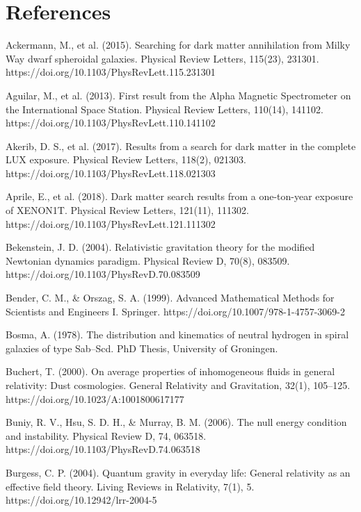 \documentclass[11pt]{article}
\begin{document}
\section{References}\label{}

\nocite{*}



\iffalse %

Ackermann, M., et al. (2015). Searching for dark matter annihilation from Milky Way dwarf spheroidal galaxies. Physical Review Letters, 115(23), 231301. https://doi.org/10.1103/PhysRevLett.115.231301

Aguilar, M., et al. (2013). First result from the Alpha Magnetic Spectrometer on the International Space Station. Physical Review Letters, 110(14), 141102. https://doi.org/10.1103/PhysRevLett.110.141102

Akerib, D. S., et al. (2017). Results from a search for dark matter in the complete LUX exposure. Physical Review Letters, 118(2), 021303. https://doi.org/10.1103/PhysRevLett.118.021303

Aprile, E., et al. (2018). Dark matter search results from a one-ton-year exposure of XENON1T. Physical Review Letters, 121(11), 111302. https://doi.org/10.1103/PhysRevLett.121.111302

Bekenstein, J. D. (2004). Relativistic gravitation theory for the modified Newtonian dynamics paradigm. Physical Review D, 70(8), 083509. https://doi.org/10.1103/PhysRevD.70.083509

Bender, C. M., \& Orszag, S. A. (1999). Advanced Mathematical Methods for Scientists and Engineers I. Springer. https://doi.org/10.1007/978-1-4757-3069-2

Bosma, A. (1978). The distribution and kinematics of neutral hydrogen in spiral galaxies of type Sab--Scd. PhD Thesis, University of Groningen.

Buchert, T. (2000). On average properties of inhomogeneous fluids in general relativity: Dust cosmologies. General Relativity and Gravitation, 32(1), 105--125. https://doi.org/10.1023/A:1001800617177

Buniy, R. V., Hsu, S. D. H., \& Murray, B. M. (2006). The null energy condition and instability. Physical Review D, 74, 063518. https://doi.org/10.1103/PhysRevD.74.063518

Burgess, C. P. (2004). Quantum gravity in everyday life: General relativity as an effective field theory. Living Reviews in Relativity, 7(1), 5. https://doi.org/10.12942/lrr-2004-5
\end{document}

